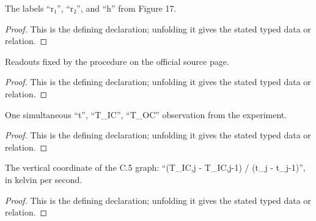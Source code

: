 \begin{definition}
  \label{decl:physics:IPhO_2026_4_C_6:Figure17Geometry}
  The labels “r₁”, “r₂”, and “h” from Figure 17.
\end{definition}
\begin{proof}
  This is the defining declaration; unfolding it gives the stated typed data or relation.
\end{proof}

\begin{definition}[ProcedureReadouts]
  \label{decl:physics:IPhO_2026_4_C_6:ProcedureReadouts}
  Readouts fixed by the procedure on the official source page.
\end{definition}
\begin{proof}
  This is the defining declaration; unfolding it gives the stated typed data or relation.
\end{proof}

\begin{definition}[TemperatureObservation]
  \label{decl:physics:IPhO_2026_4_C_6:TemperatureObservation}
  One simultaneous “t”, “T\_IC”, “T\_OC” observation from the experiment.
\end{definition}
\begin{proof}
  This is the defining declaration; unfolding it gives the stated typed data or relation.
\end{proof}

\begin{definition}[finiteDifferenceInnerRateSI]
  \label{decl:physics:IPhO_2026_4_C_6:finiteDifferenceInnerRateSI}
  The vertical coordinate of the C.5 graph: “(T\_IC,j - T\_IC,j-1) / (t\_j - t\_j-1)”, in kelvin per second.
\end{definition}
\begin{proof}
  This is the defining declaration; unfolding it gives the stated typed data or relation.
\end{proof}

